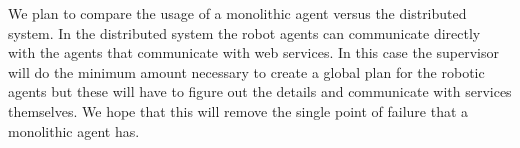 We plan to compare the usage of a monolithic agent versus the distributed
system. In the distributed system the robot agents can communicate directly
with the agents that communicate with web services. In this case the supervisor
will do the minimum amount necessary to create a global plan for the robotic
agents but these will have to figure out the details and communicate with
services themselves. We hope that this will remove the single point of failure
that a monolithic agent has.